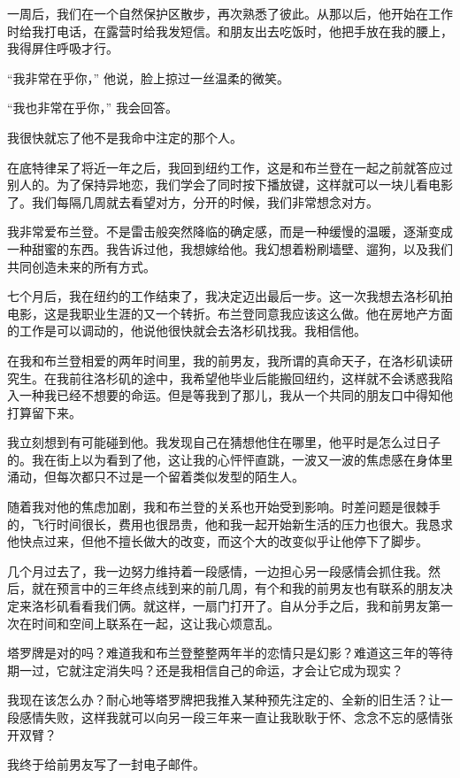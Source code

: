 一周后，我们在一个自然保护区散步，再次熟悉了彼此。从那以后，他开始在工作时给我打电话，在露营时给我发短信。和朋友出去吃饭时，他把手放在我的腰上，我得屏住呼吸才行。


“我非常在乎你，” 他说，脸上掠过一丝温柔的微笑。


“我也非常在乎你，” 我会回答。


我很快就忘了他不是我命中注定的那个人。


在底特律呆了将近一年之后，我回到纽约工作，这是和布兰登在一起之前就答应过别人的。为了保持异地恋，我们学会了同时按下播放键，这样就可以一块儿看电影了。我们每隔几周就去看望对方，分开的时候，我们非常想念对方。


我非常爱布兰登。不是雷击般突然降临的确定感，而是一种缓慢的温暖，逐渐变成一种甜蜜的东西。我告诉过他，我想嫁给他。我幻想着粉刷墙壁、遛狗，以及我们共同创造未来的所有方式。


七个月后，我在纽约的工作结束了，我决定迈出最后一步。这一次我想去洛杉矶拍电影，这是我职业生涯的又一个转折。布兰登同意我应该这么做。他在房地产方面的工作是可以调动的，他说他很快就会去洛杉矶找我。我相信他。


在我和布兰登相爱的两年时间里，我的前男友，我所谓的真命天子，在洛杉矶读研究生。在我前往洛杉矶的途中，我希望他毕业后能搬回纽约，这样就不会诱惑我陷入一种我已经不想要的命运。但是等我到了那儿，我从一个共同的朋友口中得知他打算留下来。


我立刻想到有可能碰到他。我发现自己在猜想他住在哪里，他平时是怎么过日子的。我在街上以为看到了他，这让我的心怦怦直跳，一波又一波的焦虑感在身体里涌动，但每次都只不过是一个留着类似发型的陌生人。


随着我对他的焦虑加剧，我和布兰登的关系也开始受到影响。时差问题是很棘手的，飞行时间很长，费用也很昂贵，他和我一起开始新生活的压力也很大。我恳求他快点过来，但他不擅长做大的改变，而这个大的改变似乎让他停下了脚步。


几个月过去了，我一边努力维持着一段感情，一边担心另一段感情会抓住我。然后，就在预言中的三年终点线到来的前几周，有个和我的前男友也有联系的朋友决定来洛杉矶看看我们俩。就这样，一扇门打开了。自从分手之后，我和前男友第一次在时间和空间上联系在一起，这让我心烦意乱。


塔罗牌是对的吗？难道我和布兰登整整两年半的恋情只是幻影？难道这三年的等待期一过，它就注定消失吗？还是我相信自己的命运，才会让它成为现实？


我现在该怎么办？耐心地等塔罗牌把我推入某种预先注定的、全新的旧生活？让一段感情失败，这样我就可以向另一段三年来一直让我耿耿于怀、念念不忘的感情张开双臂？


我终于给前男友写了一封电子邮件。


